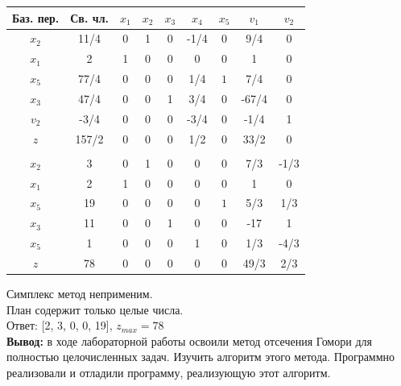 \documentclass[a4paper,14pt]{extarticle}
\begin{document}
\begin{center}
    \begin{longtable}{|c|c|c|c|c|c|c|c|c|}
        \hline
        Баз. пер. & Св. чл. & $x_1$ & $x_2$ & $x_3$ & $x_4 $ & $x_5$ & $v_1$ & $v_2$ \\
        \hline
        $x_2$     & 11/4    & 0     & 1     & 0     & -1/4   & $0$   & 9/4  & 0   \\
        \hline
        $x_1$     & 2       & 1     & 0     & 0     & 0      & $0$   & 1   & 0  \\
        \hline
        $x_5$     & 77/4    & 0     & 0     & 0     & 1/4    & $1$   & 7/4  & 0   \\
        \hline
        $x_3$     & 47/4    & 0     & 0     & 1     & 3/4    & 0     & -67/4  & 0   \\
        \hline
        $v_2$     & -3/4    & 0     & 0     & 0     & -3/4    & 0     & -1/4  & 1   \\
        \hline
        $z$       & 157/2   & 0     & 0     & 0     & 1/2    & $0$  & 33/2  & 0   \\
        \hline
        \multicolumn{9}{c}{}\\
        \hline
        $x_2$     & 3    & 0     & 1     & 0     & 0   & $0$   & 7/3  & -1/3   \\
        \hline
        $x_1$     & 2       & 1     & 0     & 0     & 0      & $0$   & 1   & 0  \\
        \hline
        $x_5$     & 19    & 0     & 0     & 0     & 0    & $1$   & 5/3  & 1/3   \\
        \hline
        $x_3$     & 11    & 0     & 0     & 1     & 0    & 0     & -17  & 1   \\
        \hline
        $x_5$     & 1    & 0     & 0     & 0     & 1    & 0     & 1/3  & -4/3   \\
        \hline
        $z$       & 78   & 0     & 0     & 0     & 0    & $0$  & 49/3  & 2/3   \\
        \hline
    \end{longtable}
\end{center}

Симплекс метод неприменим.\\
План содержит только целые числа.\\
Ответ: [2, 3, 0, 0, 19], $z_{max} = 78$\\

\textbf{Вывод: } в ходе лабораторной работы освоили метод отсечения Гомори для полностью
целочисленных задач. Изучить алгоритм этого метода. Программно
реализовали и отладили программу, реализующую этот алгоритм. 
\end{document}
